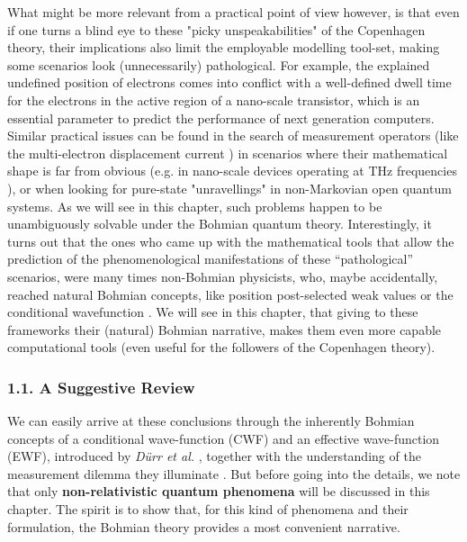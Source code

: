 \documentclass[11pt, a4paper]{article} %
\begin{document}
What might be more relevant from a practical point of view however, is that even if one turns a blind eye to these "picky unspeakabilities" of the Copenhagen theory, their implications also limit the employable modelling tool-set, making some scenarios look (unnecessarily) pathological. For example, the explained undefined position of electrons comes into conflict with a well-defined dwell time for the electrons in the active region of a nano-scale transistor, which is an essential parameter to predict the performance of next generation computers. Similar practical issues can be found in the search of measurement operators (like the multi-electron displacement current \cite{equiv, Pel}) in scenarios where their mathematical shape is far from obvious (e.g. in nano-scale devices operating at THz frequencies \cite{Thz}), or when looking for pure-state "unravellings" in non-Markovian open quantum systems. As we will see in this chapter, such problems happen to be unambiguously solvable under the Bohmian quantum theory. Interestingly, it turns out that  the ones who came up with the mathematical tools that allow the prediction of the phenomenological manifestations of these “pathological” scenarios, were many times non-Bohmian physicists, who, maybe accidentally, reached natural Bohmian concepts, like position post-selected weak values \cite{Weak} or the conditional wavefunction \cite{interpretSSE,NMisModal}. We will see in this chapter, that giving to these frameworks their (natural) Bohmian narrative, makes them even more capable computational tools (even useful for the followers of the Copenhagen theory).  \vspace{-0.2cm}


\subsubsection*{1.1. A Suggestive Review}
\vspace{-0.2cm}
We can easily arrive at these conclusions through the inherently Bohmian concepts of a conditional wave-function (CWF) and an effective wave-function (EWF), introduced by {\em Dürr et al.} \cite{Absolute}, together with the understanding of the measurement dilemma they illuminate \cite{operatorsObservables}. But before going into the details, we note that only {\bf non-relativistic quantum phenomena} will be discussed in this chapter. The spirit is to show that, for this kind of phenomena and their formulation, the Bohmian theory provides a most convenient narrative.
\end{document}
